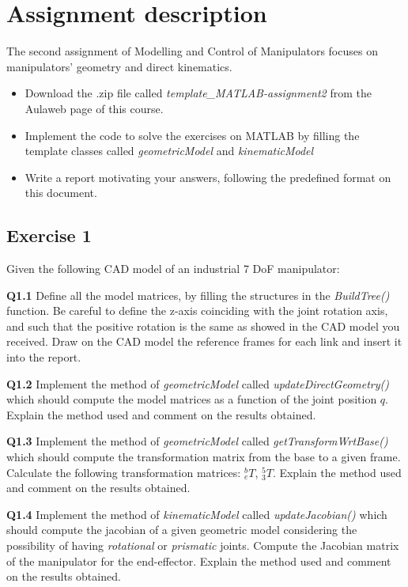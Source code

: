 \section{Assignment description}
The second assignment of Modelling and Control of Manipulators focuses on manipulators' geometry and direct kinematics. 

\begin{itemize}
    \item Download the .zip file called \textit{template\_MATLAB-assignment2} from the Aulaweb page of this course.
    \item Implement the code to solve the exercises on MATLAB by filling the template classes called \textit{geometricModel} and \textit{kinematicModel}
    \item Write a report motivating your answers, following the predefined format on this document.
\end{itemize}

\subsection{Exercise 1}
 Given the following CAD model of an industrial 7 DoF manipulator:
 
\textbf{Q1.1} Define all the model matrices, by filling the structures in the \textit{BuildTree()} function. Be careful to define the z-axis coinciding with the joint rotation axis, and such that the positive rotation is the same as showed in the CAD model you received. Draw on the CAD model the reference frames for each link and insert it into the report.

\textbf{Q1.2} Implement the method of \textit{geometricModel} called \textit{updateDirectGeometry()} which should compute the model matrices as a function of the joint position $q$. Explain the method used and comment on the results obtained.

\textbf{Q1.3} Implement the method of \textit{geometricModel} called \textit{getTransformWrtBase()} which should compute the transformation matrix from the base to a given frame. Calculate the following transformation matrices: $^b_e T$, $^5_3 T$. Explain the method used and comment on the results obtained.

\textbf{Q1.4} Implement the method of \textit{kinematicModel} called \textit{updateJacobian()} which should compute the jacobian of a given geometric model considering the possibility of having \textit{rotational} or \textit{prismatic} joints. Compute the Jacobian matrix of the manipulator for the end-effector. Explain the method used and comment on the results obtained.

